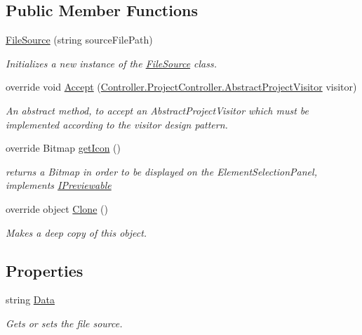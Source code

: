 \subsection*{Public Member Functions}
\begin{DoxyCompactItemize}
\item 
\hyperlink{class_a_rdev_kit_1_1_model_1_1_project_1_1_file_source_a0afe3f4740ae74c4d545154be596e5a2}{File\-Source} (string source\-File\-Path)
\begin{DoxyCompactList}\small\item\em Initializes a new instance of the \hyperlink{class_a_rdev_kit_1_1_model_1_1_project_1_1_file_source}{File\-Source} class. \end{DoxyCompactList}\item 
override void \hyperlink{class_a_rdev_kit_1_1_model_1_1_project_1_1_file_source_ad20118e7638c1660059be7740a2ab080}{Accept} (\hyperlink{class_a_rdev_kit_1_1_controller_1_1_project_controller_1_1_abstract_project_visitor}{Controller.\-Project\-Controller.\-Abstract\-Project\-Visitor} visitor)
\begin{DoxyCompactList}\small\item\em An abstract method, to accept an Abstract\-Project\-Visitor which must be implemented according to the visitor design pattern. \end{DoxyCompactList}\item 
override Bitmap \hyperlink{class_a_rdev_kit_1_1_model_1_1_project_1_1_file_source_a1c35e8b945898af5787b60f3de7a2d26}{get\-Icon} ()
\begin{DoxyCompactList}\small\item\em returns a Bitmap in order to be displayed on the Element\-Selection\-Panel, implements \hyperlink{interface_a_rdev_kit_1_1_model_1_1_project_1_1_i_previewable}{I\-Previewable} \end{DoxyCompactList}\item 
override object \hyperlink{class_a_rdev_kit_1_1_model_1_1_project_1_1_file_source_ac97ee603e5e8f17bea48dc1d81e7b531}{Clone} ()
\begin{DoxyCompactList}\small\item\em Makes a deep copy of this object. \end{DoxyCompactList}\end{DoxyCompactItemize}
\subsection*{Properties}
\begin{DoxyCompactItemize}
\item 
string \hyperlink{class_a_rdev_kit_1_1_model_1_1_project_1_1_file_source_a9f1dd2b4c0e9eb8c4f8464ece5f544c3}{Data}
\begin{DoxyCompactList}\small\item\em Gets or sets the file source. \end{DoxyCompactList}\end{DoxyCompactItemize}
